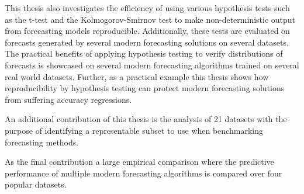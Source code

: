 This thesis also investigates the efficiency of using various hypothesis tests such as the t-test and the Kolmogorov-Smirnov test to make non-deterministic output from forecasting models reproducible. Additionally, these tests are evaluated on forecasts generated by several modern forecasting solutions on several datasets. The practical benefits of applying hypothesis testing to verify distributions of forecasts is showcased on several modern forecasting algorithms trained on several real world datasets. Further, as a practical example this thesis shows how reproducibility by hypothesis testing can protect modern forecasting solutions from suffering accuracy regressions. 

An additional contribution of this thesis is the analysis of 21 datasets with the purpose of identifying a representable subset to use when benchmarking forecasting methods.

As the final contribution a large empirical comparison where the predictive performance of multiple modern forecasting algorithms is compared over four popular datasets.






